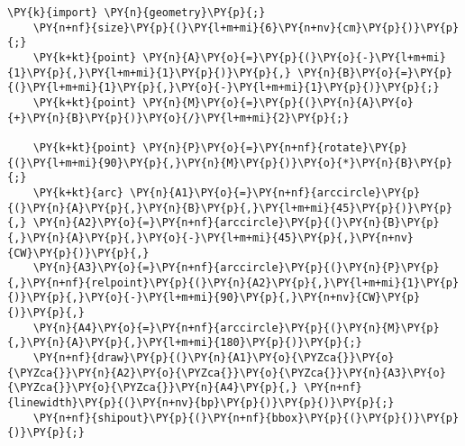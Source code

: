 \begin{Verbatim}[commandchars=\\\{\}]
    \PY{k}{import} \PY{n}{geometry}\PY{p}{;}
    \PY{n+nf}{size}\PY{p}{(}\PY{l+m+mi}{6}\PY{n+nv}{cm}\PY{p}{)}\PY{p}{;}
    \PY{k+kt}{point} \PY{n}{A}\PY{o}{=}\PY{p}{(}\PY{o}{-}\PY{l+m+mi}{1}\PY{p}{,}\PY{l+m+mi}{1}\PY{p}{)}\PY{p}{,} \PY{n}{B}\PY{o}{=}\PY{p}{(}\PY{l+m+mi}{1}\PY{p}{,}\PY{o}{-}\PY{l+m+mi}{1}\PY{p}{)}\PY{p}{;}
    \PY{k+kt}{point} \PY{n}{M}\PY{o}{=}\PY{p}{(}\PY{n}{A}\PY{o}{+}\PY{n}{B}\PY{p}{)}\PY{o}{/}\PY{l+m+mi}{2}\PY{p}{;}

    \PY{k+kt}{point} \PY{n}{P}\PY{o}{=}\PY{n+nf}{rotate}\PY{p}{(}\PY{l+m+mi}{90}\PY{p}{,}\PY{n}{M}\PY{p}{)}\PY{o}{*}\PY{n}{B}\PY{p}{;}
    \PY{k+kt}{arc} \PY{n}{A1}\PY{o}{=}\PY{n+nf}{arccircle}\PY{p}{(}\PY{n}{A}\PY{p}{,}\PY{n}{B}\PY{p}{,}\PY{l+m+mi}{45}\PY{p}{)}\PY{p}{,} \PY{n}{A2}\PY{o}{=}\PY{n+nf}{arccircle}\PY{p}{(}\PY{n}{B}\PY{p}{,}\PY{n}{A}\PY{p}{,}\PY{o}{-}\PY{l+m+mi}{45}\PY{p}{,}\PY{n+nv}{CW}\PY{p}{)}\PY{p}{,}
    \PY{n}{A3}\PY{o}{=}\PY{n+nf}{arccircle}\PY{p}{(}\PY{n}{P}\PY{p}{,}\PY{n+nf}{relpoint}\PY{p}{(}\PY{n}{A2}\PY{p}{,}\PY{l+m+mi}{1}\PY{p}{)}\PY{p}{,}\PY{o}{-}\PY{l+m+mi}{90}\PY{p}{,}\PY{n+nv}{CW}\PY{p}{)}\PY{p}{,}
    \PY{n}{A4}\PY{o}{=}\PY{n+nf}{arccircle}\PY{p}{(}\PY{n}{M}\PY{p}{,}\PY{n}{A}\PY{p}{,}\PY{l+m+mi}{180}\PY{p}{)}\PY{p}{;}
    \PY{n+nf}{draw}\PY{p}{(}\PY{n}{A1}\PY{o}{\PYZca{}}\PY{o}{\PYZca{}}\PY{n}{A2}\PY{o}{\PYZca{}}\PY{o}{\PYZca{}}\PY{n}{A3}\PY{o}{\PYZca{}}\PY{o}{\PYZca{}}\PY{n}{A4}\PY{p}{,} \PY{n+nf}{linewidth}\PY{p}{(}\PY{n+nv}{bp}\PY{p}{)}\PY{p}{)}\PY{p}{;}
    \PY{n+nf}{shipout}\PY{p}{(}\PY{n+nf}{bbox}\PY{p}{(}\PY{p}{)}\PY{p}{)}\PY{p}{;}
\end{Verbatim}
